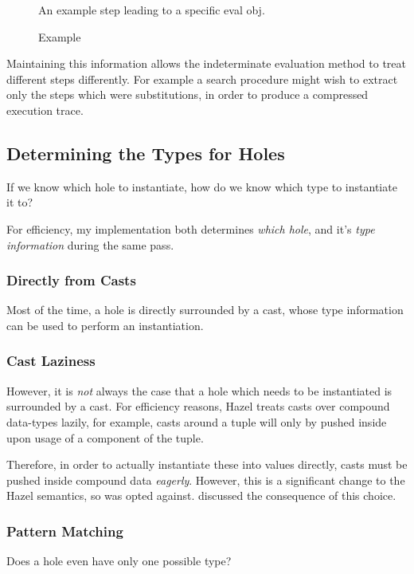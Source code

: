 \begin{figure}
An example step leading to a specific eval obj.
\caption{ Example}
\label{fig:EvalObjExample)}
\end{figure}

Maintaining this information allows the indeterminate evaluation method to treat different steps differently. For example a search procedure might wish to extract only the steps which were substitutions, in order to produce a compressed execution trace.

\subsection{Determining the Types for Holes}
\label{sec:TypesForHoles}
If we know which hole to instantiate, how do we know which type to instantiate it to?

For efficiency, my implementation both determines \textit{which hole}, and it's \textit{type information} during the same pass.

\subsubsection{Directly from Casts}
Most of the time, a hole is directly surrounded by a cast, whose type information can be used to perform an instantiation.

\subsubsection{Cast Laziness}\label{sec:CastLaziness}
However, it is \textit{not} always the case that a hole which needs to be instantiated is surrounded by a cast. For efficiency reasons, Hazel treats casts over compound data-types lazily, for example, casts around a tuple will only by pushed inside upon usage of a component of the tuple.

Therefore, in order to actually instantiate these into values directly, casts must be pushed inside compound data \textit{eagerly}. However, this is a significant change to the Hazel semantics, so was opted against.  discussed the consequence of this choice. 


\subsubsection{Pattern Matching}
\label{sec:PatternMatching}
Does a hole even have only one possible type?

